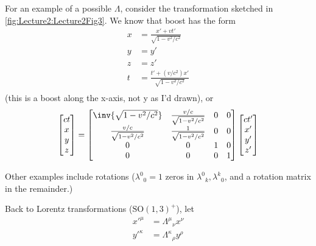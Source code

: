 For an example of a possible \( \Lambda \), consider the transformation sketched in
\cref{fig:Lecture2:Lecture2Fig3}.
We know that boost has the form
\begin{equation}\label{eqn:qftLecture2:540}
\begin{aligned}
x &= \frac{x' + v t'}{\sqrt{1 - v^2/c^2}} \\
y &= y' \\
z &= z' \\
t &= \frac{t' + (v/c^2) x'}{\sqrt{1 - v^2/c^2}} \\
\end{aligned}
\end{equation}
(this is a boost along the x-axis, not y as I'd drawn),
or
\begin{equation}\label{eqn:qftLecture2:560}
\begin{bmatrix}
c t \\
x \\
y \\
z
\end{bmatrix}
=
\begin{bmatrix}
\inv{\sqrt{1 - v^2/c^2}} & \frac{v/c}{\sqrt{1 - v^2/c^2}} & 0 & 0 \\
\frac{v/c}{\sqrt{1 - v^2/c^2}} & \frac{1}{\sqrt{1 - v^2/c^2}} & 0 & 0 \\
0 & 0 & 1 & 0 \\
0 & 0 & 0 & 1 \\
\end{bmatrix}
\begin{bmatrix}
c t' \\
x' \\
y' \\
z'
\end{bmatrix}
\end{equation}

Other examples include rotations (\({\lambda^0}_0 = 1\) zeros in \( {\lambda^0}_k, {\lambda^k}_0 \), and a rotation matrix in the remainder.)

Back to Lorentz transformations (\(\text{SO}(1,3)^+\)), let
\begin{equation}\label{eqn:qftLecture2:600}
\begin{aligned}
{x'}^\mu    &= {\Lambda^\mu}_\nu x^\nu \\
{y'}^\kappa &= {\Lambda^\kappa}_\rho y^\rho
\end{aligned}
\end{equation}

